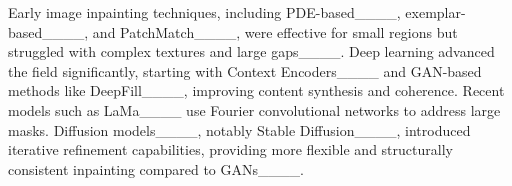 

\vspace{3pt}
Early image inpainting techniques, including PDE-based____, exemplar-based____, and PatchMatch____, were effective for small regions but struggled with complex textures and large gaps____. Deep learning advanced the field significantly, starting with Context Encoders____ and GAN-based methods like DeepFill____, improving content synthesis and coherence. Recent models such as LaMa____ use Fourier convolutional networks to address large masks. Diffusion models____, notably Stable Diffusion____, introduced iterative refinement capabilities, providing more flexible and structurally consistent inpainting compared to GANs____.

